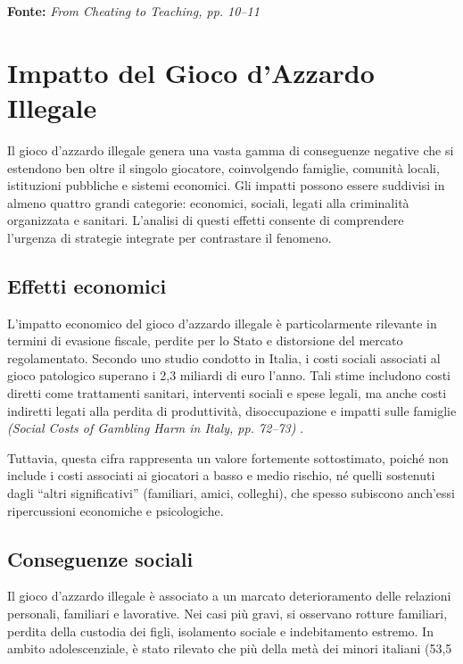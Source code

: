 \documentclass[a4paper,12pt]{article}
\begin{document}
\textbf{Fonte:} \textit{From Cheating to Teaching, pp. 10--11} \cite{bento2010cheating}


\section{Impatto del Gioco d'Azzardo Illegale}

Il gioco d’azzardo illegale genera una vasta gamma di conseguenze negative che si estendono ben oltre il singolo giocatore, coinvolgendo famiglie, comunità locali, istituzioni pubbliche e sistemi economici. Gli impatti possono essere suddivisi in almeno quattro grandi categorie: economici, sociali, legati alla criminalità organizzata e sanitari. L’analisi di questi effetti consente di comprendere l’urgenza di strategie integrate per contrastare il fenomeno.

\subsection{Effetti economici}

L’impatto economico del gioco d’azzardo illegale è particolarmente rilevante in termini di evasione fiscale, perdite per lo Stato e distorsione del mercato regolamentato. Secondo uno studio condotto in Italia, i costi sociali associati al gioco patologico superano i 2,3 miliardi di euro l’anno. Tali stime includono costi diretti come trattamenti sanitari, interventi sociali e spese legali, ma anche costi indiretti legati alla perdita di produttività, disoccupazione e impatti sulle famiglie \textit{(Social Costs of Gambling Harm in Italy, pp. 72--73)} \cite{lucchini2022socialcosts}.

Tuttavia, questa cifra rappresenta un valore fortemente sottostimato, poiché non include i costi associati ai giocatori a basso e medio rischio, né quelli sostenuti dagli “altri significativi” (familiari, amici, colleghi), che spesso subiscono anch’essi ripercussioni economiche e psicologiche.

\subsection{Conseguenze sociali}

Il gioco d’azzardo illegale è associato a un marcato deterioramento delle relazioni personali, familiari e lavorative. Nei casi più gravi, si osservano rotture familiari, perdita della custodia dei figli, isolamento sociale e indebitamento estremo. In ambito adolescenziale, è stato rilevato che più della metà dei minori italiani (53,5%
\end{document}
